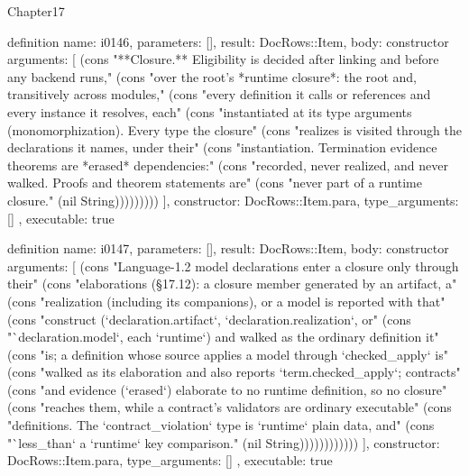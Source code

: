 \begin{lexlean}{Chapter17}
\begin{semanticmodule}
definition{
  name: i0146,
  parameters: [],
  result: DocRows::Item,
  body: constructor{
    arguments: [
      (cons "**Closure.** Eligibility is decided after linking and before any backend runs," (cons "over the root's *runtime closure*: the root and, transitively across modules," (cons "every definition it calls or references and every instance it resolves, each" (cons "instantiated at its type arguments (monomorphization). Every type the closure" (cons "realizes is visited through the declarations it names, under their" (cons "instantiation. Termination evidence theorems are *erased* dependencies:" (cons "recorded, never realized, and never walked. Proofs and theorem statements are" (cons "never part of a runtime closure." (nil String)))))))))
    ],
    constructor: DocRows::Item.para,
    type_arguments: []
  },
  executable: true
}

definition{
  name: i0147,
  parameters: [],
  result: DocRows::Item,
  body: constructor{
    arguments: [
      (cons "Language-1.2 model declarations enter a closure only through their" (cons "elaborations (§17.12): a closure member generated by an artifact, a" (cons "realization (including its companions), or a model is reported with that" (cons "construct (`declaration.artifact`, `declaration.realization`, or" (cons "`declaration.model`, each `runtime`) and walked as the ordinary definition it" (cons "is; a definition whose source applies a model through `checked_apply` is" (cons "walked as its elaboration and also reports `term.checked_apply`; contracts" (cons "and evidence (`erased`) elaborate to no runtime definition, so no closure" (cons "reaches them, while a contract's validators are ordinary executable" (cons "definitions. The `contract_violation` type is `runtime` plain data, and" (cons "`less_than` a `runtime` key comparison." (nil String))))))))))))
    ],
    constructor: DocRows::Item.para,
    type_arguments: []
  },
  executable: true
}


\end{semanticmodule}
\end{lexlean}
